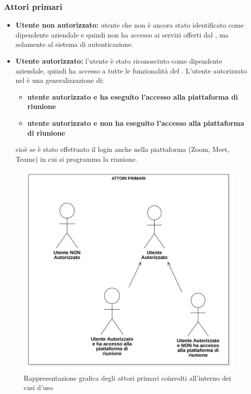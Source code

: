 \subsubsection{Attori primari}
\begin{itemize}
    \item \textbf{Utente non autorizzato:} utente che non è ancora stato identificato come dipendente aziendale e quindi non ha accesso ai servizi offerti dal , ma solamente al sistema di autenticazione.
    \item \textbf{Utente autorizzato:} l'utente è stato riconosciuto come dipendente aziendale, quindi 
                ha accesso a tutte le funzionalità del . \newline
                L'utente autorizzato nel  è una generalizzazione di:
                \begin{itemize}
                \item \textbf{utente autorizzato e ha eseguito l'accesso alla piattaforma di riunione}
                \item \textbf{utente autorizzato e non ha eseguito l'accesso alla piattaforma di riunione}
                \end{itemize}
                cioè se è stato effettuato il login anche nella piattaforma (Zoom, Meet, Teams) in 
                cui si programma la riunione.
\end{itemize}
\begin{figure}[H]
    \centering
    \includegraphics[scale=0.35]{images/attori_primari.jpg} 
    \caption{Rappresentazione grafica degli attori primari coinvolti all'interno dei casi d'uso}
\end{figure}


